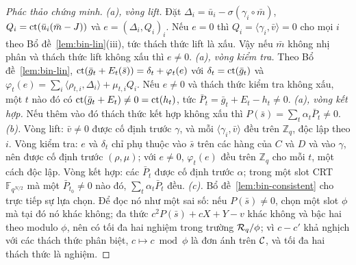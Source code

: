 \begin{proof}[Phác thảo chứng minh]
\emph{(a), vòng lift.} Đặt $\Delta_i=\bar u_i-\sigma(\gamma_i\circ\bar m)$,
$Q_i=\mathrm{ct}(\bar u_i(\bar m-J))$ và $e=(\Delta_i,Q_i)_i$. Nếu $e=0$ thì
$Q_i=\langle\gamma_i,\bar v\rangle=0$ cho mọi $i$ theo
Bổ đề~\ref{lem:bin-lin}(iii), tức thách thức lift là xấu. Vậy nếu $\bar m$
không nhị phân và thách thức lift không xấu thì $e\ne0$.
\emph{(a), vòng kiểm tra.} Theo Bổ đề~\ref{lem:bin-lin},
$\mathrm{ct}(\bar g_t+E_t(\bar s))=\delta_t+\varphi_t(e)$ với
$\delta_t=\mathrm{ct}(\bar g_t)$ và
$\varphi_t(e)=\sum_i\langle\rho_{t,i},\Delta_i\rangle+\mu_{t,i}Q_i$. Nếu
$e\ne0$ và thách thức kiểm tra không xấu, một $t$ nào đó có
$\mathrm{ct}(\bar g_t+E_t)\ne0=\mathrm{ct}(h_t)$, tức $\bar P_t=\bar g_t+E_t-h_t\ne0$.
\emph{(a), vòng kết hợp.} Nếu thêm vào đó thách thức kết hợp không xấu thì
$P(\bar s)=\sum_t\alpha_t\bar P_t\ne0$.
\emph{(b).} Vòng lift: $\bar v\ne0$ được cố định trước $\gamma$, và mỗi
$\langle\gamma_i,\bar v\rangle$ đều trên $\mathbb Z_q$, độc lập theo $i$.
Vòng kiểm tra: $e$ và $\delta_t$ chỉ phụ thuộc vào $\bar s$ trên các hàng của
$C$ và $D$ và vào $\gamma$, nên được cố định trước $(\rho,\mu)$; với $e\ne0$,
$\varphi_t(e)$ đều trên $\mathbb Z_q$ cho mỗi $t$, một cách độc lập. Vòng kết
hợp: các $\bar P_t$ được cố định trước $\alpha$; trong một slot CRT
$\mathbb F_{q^{N/2}}$ mà một $\bar P_{t_0}\ne0$ nào đó,
$\sum_t\alpha_t\bar P_t$ đều.
\emph{(c).} Bổ đề~\ref{lem:bin-consistent} cho trực tiếp sự lựa chọn. Để đọc
nó như một sai số: nếu $P(\bar s)\ne0$, chọn một slot $\phi$ mà tại đó nó khác
không; đa thức $c^2P(\bar s)+cX+Y-v$ khác không và bậc hai theo modulo $\phi$,
nên có tối đa hai nghiệm trong trường $\mathcal{R}_q/\phi$; vì $c-c'$ khả nghịch với các
thách thức phân biệt, $c\mapsto c\bmod\phi$ là đơn ánh trên $\mathcal{C}$, và tối đa
hai thách thức là nghiệm.
\end{proof}

